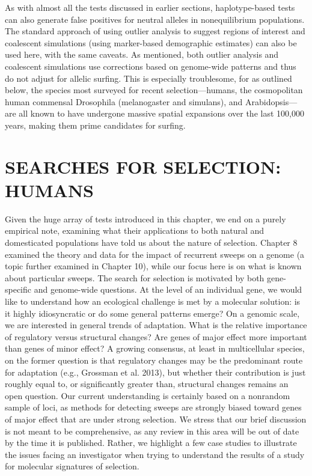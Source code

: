 \documentclass{article}
\begin{document}
As with almost all the tests discussed in earlier sections, haplotype-based tests can also generate false positives for neutral alleles in nonequilibrium populations. The standard approach of using outlier analysis to suggest regions of interest and coalescent simulations (using marker-based demographic estimates) can also be used here, with the same caveats. As mentioned, both outlier analysis and coalescent simulations use corrections based on genome-wide patterns and thus do not adjust for allelic surfing. This is especially troublesome, for as outlined below, the species most surveyed for recent selection—humans, the cosmopolitan human commensal Drosophila (melanogaster and simulans), and Arabidopsis—are all known to have undergone massive spatial expansions over the last 100,000 years, making them prime candidates for surfing.

\section{SEARCHES FOR SELECTION: HUMANS}
Given the huge array of tests introduced in this chapter, we end on a purely empirical note, examining what their applications to both natural and domesticated populations have told us about the nature of selection. Chapter 8 examined the theory and data for the impact of recurrent sweeps on a genome (a topic further examined in Chapter 10), while our focus here is on what is known about particular sweeps. The search for selection is motivated by both gene-specific and genome-wide questions. At the level of an individual gene, we would like to understand how an ecological challenge is met by a molecular solution: is it highly idiosyncratic or do some general patterns emerge? On a genomic scale, we are interested in general trends of adaptation. What is the relative importance of regulatory versus structural changes? Are genes of major effect more important than genes of minor effect? A growing consensus, at least in multicellular species, on the former question is that regulatory changes may be the predominant route for adaptation (e.g., Grossman et al. 2013), but whether their contribution is just roughly equal to, or significantly greater than, structural changes remains an open question. Our current understanding is certainly based on a nonrandom sample of loci, as methods for detecting sweeps are strongly biased toward genes of major effect that are under strong selection. We stress that our brief discussion is not meant to be comprehensive, as any review in this area will be out of date by the time it is published. Rather, we highlight a few case studies to illustrate the issues facing an investigator when trying to understand the results of a study for molecular signatures of selection.
\end{document}
